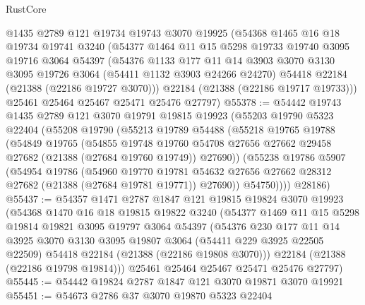 \begin{lexlean}{RustCore}
\begin{coremodule}
    @1435
    @2789
    @121
    @19734
    @19743
    @3070
    @19925
    (@54368
      @1465
      @16
      @18
      @19734
      @19741
      @3240
      (@54377
        @1464
        @11
        @15
        @5298
        @19733
        @19740
        @3095
        @19716
        @3064
        @54397
        (@54376
          @1133
          @177
          @11
          @14
          @3903
          @3070
          @3130
          @3095
          @19726
          @3064
          (@54411 @1132 @3903 @24266 @24270)
          @54418
          @22184
          (@21388 (@22186 @19727 @3070)))
        @22184
        (@21388 (@22186 @19717 @19733)))
      @25461
      @25464
      @25467
      @25471
      @25476
      @27797)
@55378 := @54442
    @19743
    @1435
    @2789
    @121
    @3070
    @19791
    @19815
    @19923
    (@55203
      @19790
      @5323
      @22404
      (@55208
        @19790
        (@55213
          @19789
          @54488
          (@55218
            @19765
            @19788
            (@54849
              @19765
              (@54855
                @19748
                @19760
                @54708
                @27656
                @27662
                @29458
                @27682
                (@21388 (@27684 @19760 @19749))
                @27690))
            (@55238
              @19786
              @5907
              (@54954
                @19786
                (@54960
                  @19770
                  @19781
                  @54632
                  @27656
                  @27662
                  @28312
                  @27682
                  (@21388 (@27684 @19781 @19771))
                  @27690))
              @54750))))
      @28186)
@55437 := @54357
    @1471
    @2787
    @1847
    @121
    @19815
    @19824
    @3070
    @19923
    (@54368
      @1470
      @16
      @18
      @19815
      @19822
      @3240
      (@54377
        @1469
        @11
        @15
        @5298
        @19814
        @19821
        @3095
        @19797
        @3064
        @54397
        (@54376
          @230
          @177
          @11
          @14
          @3925
          @3070
          @3130
          @3095
          @19807
          @3064
          (@54411 @229 @3925 @22505 @22509)
          @54418
          @22184
          (@21388 (@22186 @19808 @3070)))
        @22184
        (@21388 (@22186 @19798 @19814)))
      @25461
      @25464
      @25467
      @25471
      @25476
      @27797)
@55445 := @54442 @19824 @2787 @1847 @121 @3070 @19871 @3070 @19921
@55451 := @54673 @2786 @37 @3070 @19870 @5323 @22404

\end{coremodule}
\end{lexlean}
